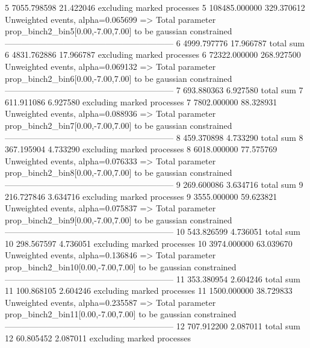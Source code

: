 5          7055.798598     21.422046       excluding marked processes    
5          108485.000000   329.370612      Unweighted events, alpha=0.065699
  => Total parameter prop_binch2_bin5[0.00,-7.00,7.00] to be gaussian constrained
------------------------------------------------------------
6          4999.797776     17.966787       total sum                     
6          4831.762886     17.966787       excluding marked processes    
6          72322.000000    268.927500      Unweighted events, alpha=0.069132
  => Total parameter prop_binch2_bin6[0.00,-7.00,7.00] to be gaussian constrained
------------------------------------------------------------
7          693.880363      6.927580        total sum                     
7          611.911086      6.927580        excluding marked processes    
7          7802.000000     88.328931       Unweighted events, alpha=0.088936
  => Total parameter prop_binch2_bin7[0.00,-7.00,7.00] to be gaussian constrained
------------------------------------------------------------
8          459.370898      4.733290        total sum                     
8          367.195904      4.733290        excluding marked processes    
8          6018.000000     77.575769       Unweighted events, alpha=0.076333
  => Total parameter prop_binch2_bin8[0.00,-7.00,7.00] to be gaussian constrained
------------------------------------------------------------
9          269.600086      3.634716        total sum                     
9          216.727846      3.634716        excluding marked processes    
9          3555.000000     59.623821       Unweighted events, alpha=0.075837
  => Total parameter prop_binch2_bin9[0.00,-7.00,7.00] to be gaussian constrained
------------------------------------------------------------
10         543.826599      4.736051        total sum                     
10         298.567597      4.736051        excluding marked processes    
10         3974.000000     63.039670       Unweighted events, alpha=0.136846
  => Total parameter prop_binch2_bin10[0.00,-7.00,7.00] to be gaussian constrained
------------------------------------------------------------
11         353.380954      2.604246        total sum                     
11         100.868105      2.604246        excluding marked processes    
11         1500.000000     38.729833       Unweighted events, alpha=0.235587
  => Total parameter prop_binch2_bin11[0.00,-7.00,7.00] to be gaussian constrained
------------------------------------------------------------
12         707.912200      2.087011        total sum                     
12         60.805452       2.087011        excluding marked processes    
